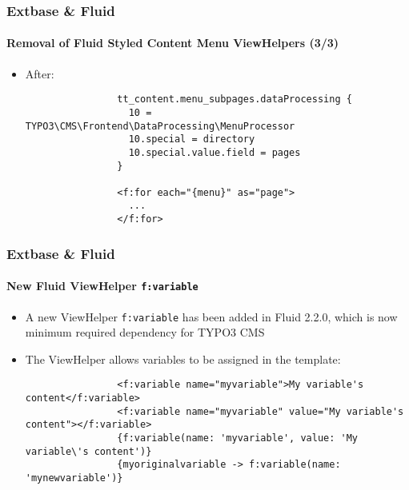 \begin{frame}[fragile]
	\frametitle{Extbase \& Fluid}
	\framesubtitle{Removal of Fluid Styled Content Menu ViewHelpers (3/3)}

	\lstset{basicstyle=\tiny\ttfamily}

	\begin{itemize}

		\item After:

			\begin{lstlisting}
				tt_content.menu_subpages.dataProcessing {
				  10 = TYPO3\CMS\Frontend\DataProcessing\MenuProcessor
				  10.special = directory
				  10.special.value.field = pages
				}

				<f:for each="{menu}" as="page">
				  ...
				</f:for>
			\end{lstlisting}

	\end{itemize}

\end{frame}


\begin{frame}[fragile]
	\frametitle{Extbase \& Fluid}
	\framesubtitle{New Fluid ViewHelper \texttt{f:variable}}

	\begin{itemize}

		\item A new ViewHelper \texttt{f:variable} has been added in Fluid 2.2.0,
			which is now minimum required dependency for TYPO3 CMS

		\item The ViewHelper allows variables to be assigned in the template:

			\begin{lstlisting}
				<f:variable name="myvariable">My variable's content</f:variable>
				<f:variable name="myvariable" value="My variable's content"></f:variable>
				{f:variable(name: 'myvariable', value: 'My variable\'s content')}
				{myoriginalvariable -> f:variable(name: 'mynewvariable')}
			\end{lstlisting}

	\end{itemize}

\end{frame}

